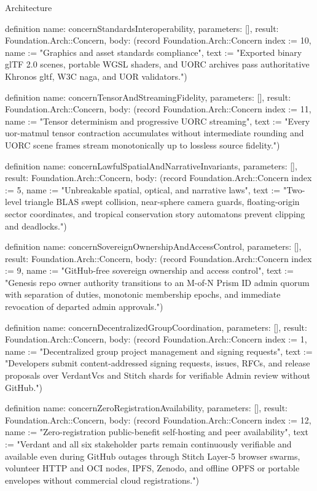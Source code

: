 \begin{lexlean}{Architecture}
\begin{semanticmodule}
definition{
  name: concernStandardsInteroperability,
  parameters: [],
  result: Foundation.Arch::Concern,
  body: (record Foundation.Arch::Concern {index := 10, name := "Graphics and asset standards compliance", text := "Exported binary glTF 2.0 scenes, portable WGSL shaders, and UORC archives pass authoritative Khronos gltf, W3C naga, and UOR validators."})
}

definition{
  name: concernTensorAndStreamingFidelity,
  parameters: [],
  result: Foundation.Arch::Concern,
  body: (record Foundation.Arch::Concern {index := 11, name := "Tensor determinism and progressive UORC streaming", text := "Every uor-matmul tensor contraction accumulates without intermediate rounding and UORC scene frames stream monotonically up to lossless source fidelity."})
}

definition{
  name: concernLawfulSpatialAndNarrativeInvariants,
  parameters: [],
  result: Foundation.Arch::Concern,
  body: (record Foundation.Arch::Concern {index := 5, name := "Unbreakable spatial, optical, and narrative laws", text := "Two-level triangle BLAS swept collision, near-sphere camera guards, floating-origin sector coordinates, and tropical conservation story automatons prevent clipping and deadlocks."})
}

definition{
  name: concernSovereignOwnershipAndAccessControl,
  parameters: [],
  result: Foundation.Arch::Concern,
  body: (record Foundation.Arch::Concern {index := 9, name := "GitHub-free sovereign ownership and access control", text := "Genesis repo owner authority transitions to an M-of-N Prism ID admin quorum with separation of duties, monotonic membership epochs, and immediate revocation of departed admin approvals."})
}

definition{
  name: concernDecentralizedGroupCoordination,
  parameters: [],
  result: Foundation.Arch::Concern,
  body: (record Foundation.Arch::Concern {index := 1, name := "Decentralized group project management and signing requests", text := "Developers submit content-addressed signing requests, issues, RFCs, and release proposals over VerdantVcs and Stitch shards for verifiable Admin review without GitHub."})
}

definition{
  name: concernZeroRegistrationAvailability,
  parameters: [],
  result: Foundation.Arch::Concern,
  body: (record Foundation.Arch::Concern {index := 12, name := "Zero-registration public-benefit self-hosting and peer availability", text := "Verdant and all six stakeholder parts remain continuously verifiable and available even during GitHub outages through Stitch Layer-5 browser swarms, volunteer HTTP and OCI nodes, IPFS, Zenodo, and offline OPFS or portable envelopes without commercial cloud registrations."})
}


\end{semanticmodule}
\end{lexlean}
